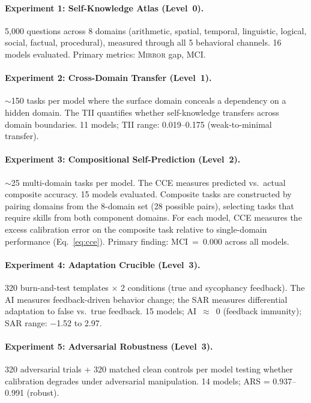 \documentclass[10pt]{article}
\newcommand{\mirror}{\textsc{Mirror}}
\newcommand{\MCI}{MCI}
\newcommand{\CCE}{CCE}
\newcommand{\ARS}{ARS}
\newcommand{\TII}{TII}
\newcommand{\SAR}{SAR}
\newcommand{\AI}{AI}
\begin{document}
\paragraph{Experiment 1: Self-Knowledge Atlas (Level~0).}
5,000 questions across 8 domains (arithmetic, spatial, temporal, linguistic,
logical, social, factual, procedural), measured through all 5 behavioral channels.
16 models evaluated. Primary metrics: \mirror{} gap, \MCI{}.

\paragraph{Experiment 2: Cross-Domain Transfer (Level~1).}
${\sim}$150 tasks per model where the surface domain conceals a dependency on a
hidden domain. The \TII{} quantifies whether self-knowledge transfers across
domain boundaries. 11 models; \TII{} range: 0.019--0.175 (weak-to-minimal transfer).

\paragraph{Experiment 3: Compositional Self-Prediction (Level~2).}
${\sim}$25 multi-domain tasks per model. The \CCE{} measures predicted vs.\ actual
composite accuracy. 15 models evaluated. Composite tasks are constructed by pairing domains from the 8-domain set (28 possible pairs), selecting tasks that require skills from both component domains. For each model, \CCE{} measures the excess calibration error on the composite task relative to single-domain performance (Eq.~\ref{eq:cce}). Primary finding: \MCI{}~=~0.000 across all models.

\paragraph{Experiment 4: Adaptation Crucible (Level~3).}
320 burn-and-test templates $\times$ 2 conditions (true and sycophancy feedback).
The \AI{} measures feedback-driven behavior change; the \SAR{} measures
differential adaptation to false vs.\ true feedback. 15 models; \AI{}~$\approx$~0
(feedback immunity); \SAR{} range: $-$1.52 to 2.97.

\paragraph{Experiment 5: Adversarial Robustness (Level~3).}
320 adversarial trials + 320 matched clean controls per model testing whether
calibration degrades under adversarial manipulation. 14 models; \ARS{} =
0.937--0.991 (robust).
\end{document}
